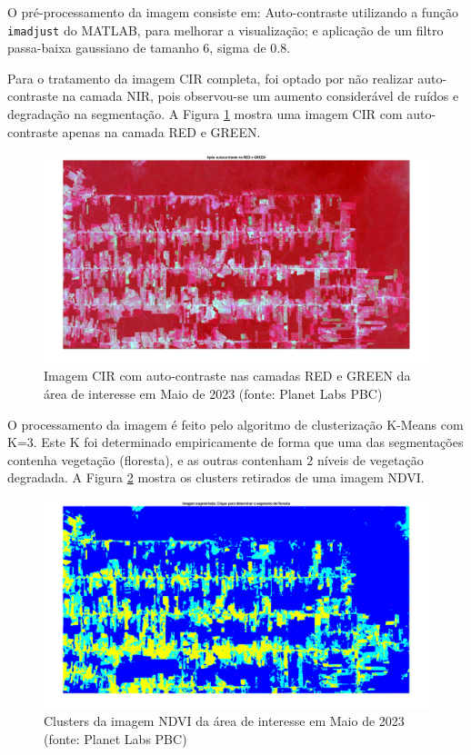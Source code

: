 \documentclass[11pt]{article}
\begin{document}
O pré-processamento da imagem consiste em: Auto-contraste utilizando a função \verb|imadjust| do MATLAB, para melhorar a visualização; e aplicação de um filtro passa-baixa gaussiano de tamanho 6, sigma de 0.8.

Para o tratamento da imagem CIR completa, foi optado por não realizar auto-contraste na camada NIR, pois observou-se um aumento considerável de ruídos e degradação na segmentação. A Figura \ref{fig:candeias_maio_2023_cir_contrast} mostra uma imagem CIR com auto-contraste apenas na camada RED e GREEN.

\begin{figure}[!htb]
	\centering
	\includegraphics[width=.9\textwidth]{candeias_maio_2023_cir_contrast.png}
	\caption{Imagem CIR com auto-contraste nas camadas RED e GREEN da área de interesse em Maio de 2023 (fonte: Planet Labs PBC)}
	\label{fig:candeias_maio_2023_cir_contrast}
\end{figure}
O processamento da imagem é feito pelo algoritmo de clusterização K-Means com K=3. Este K foi determinado empiricamente de forma que uma das segmentações contenha vegetação (floresta), e as outras contenham 2 níveis de vegetação degradada. A Figura \ref{fig:candeias_maio_2023_ndvi_clusters} mostra os clusters retirados de uma imagem NDVI.

\begin{figure}[!htb]
	\centering
	\includegraphics[width=.9\textwidth]{candeias_maio_2023_ndvi_clusters.png}
	\caption{Clusters da imagem NDVI da área de interesse em Maio de 2023 (fonte: Planet Labs PBC)}
	\label{fig:candeias_maio_2023_ndvi_clusters}
\end{figure}
\end{document}
